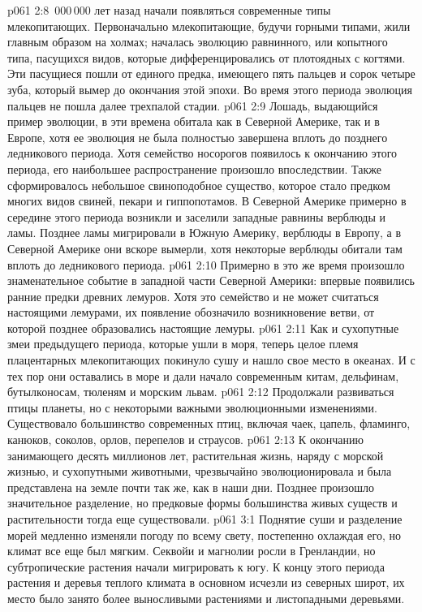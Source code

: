 \vs p061 2:8 \,000\,000 лет назад начали появляться современные типы млекопитающих. Первоначально млекопитающие, будучи горными типами, жили главным образом на холмах;  началась эволюцию равнинного, или копытного типа, пасущихся видов, которые дифференцировались от плотоядных с когтями. Эти пасущиеся пошли от единого предка, имеющего пять пальцев и сорок четыре зуба, который вымер до окончания этой эпохи. Во время этого периода эволюция пальцев не пошла далее трехпалой стадии.
\vs p061 2:9 Лошадь, выдающийся пример эволюции, в эти времена обитала как в Северной Америке, так и в Европе, хотя ее эволюция не была полностью завершена вплоть до позднего ледникового периода. Хотя семейство носорогов появилось к окончанию этого периода, его наибольшее распространение произошло впоследствии. Также сформировалось небольшое свиноподобное существо, которое стало предком многих видов свиней, пекари и гиппопотамов. В Северной Америке примерно в середине этого периода возникли и заселили западные равнины верблюды и ламы. Позднее ламы мигрировали в Южную Америку, верблюды в Европу, а в Северной Америке они вскоре вымерли, хотя некоторые верблюды обитали там вплоть до ледникового периода.
\vs p061 2:10 Примерно в это же время произошло знаменательное событие в западной части Северной Америки: впервые появились ранние предки древних лемуров. Хотя это семейство и не может считаться настоящими лемурами, их появление обозначило возникновение ветви, от которой позднее образовались настоящие лемуры.
\vs p061 2:11 Как и сухопутные змеи предыдущего периода, которые ушли в моря, теперь целое племя плацентарных млекопитающих покинуло сушу и нашло свое место в океанах. И с тех пор они оставались в море и дали начало современным китам, дельфинам, бутылконосам, тюленям и морским львам.
\vs p061 2:12 Продолжали развиваться птицы планеты, но с некоторыми важными эволюционными изменениями. Существовало большинство современных птиц, включая чаек, цапель, фламинго, канюков, соколов, орлов, перепелов и страусов.
\vs p061 2:13 \pc К окончанию  занимающего десять миллионов лет, растительная жизнь, наряду с морской жизнью, и сухопутными животными, чрезвычайно эволюционировала и была представлена на земле почти так же, как в наши дни. Позднее произошло значительное разделение, но предковые формы большинства живых существ и растительности тогда еще существовали.
\vs p061 3:1 Поднятие суши и разделение морей медленно изменяли погоду по всему свету, постепенно охлаждая его, но климат все еще был мягким. Секвойи и магнолии росли в Гренландии, но субтропические растения начали мигрировать к югу. К концу этого периода растения и деревья теплого климата в основном исчезли из северных широт, их место было занято более выносливыми растениями и листопадными деревьями.

